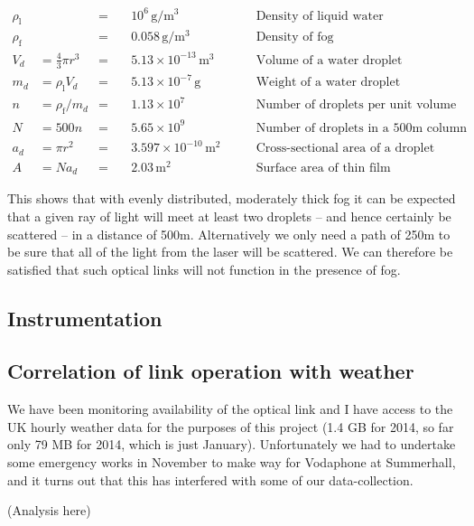 \begin{align}
  \rho_{\text{l}} &&=&\quad 10^6\,\text{g}/\text{m}^3 
  &\qquad\text{Density of liquid water}\\
  \rho_{\text{f}} &&=&\quad 0.058\,\text{g}/\text{m}^3
  &\qquad\text{Density of fog}\\
  V_d &= \frac{4}{3}\pi r^3 &=&\quad 5.13\times 10^{-13}\,\text{m}^3
  &\qquad\text{Volume of a water droplet}\\ 
  m_d &= \rho_{\text{l}} V_d &=&\quad 5.13\times 10^{-7}\,\text{g}
  &\qquad\text{Weight of a water droplet}\\
  n &= \rho_{\text{f}}/m_d &=&\quad 1.13\times 10^{7}
  &\qquad\text{Number of droplets per unit volume}\\
  N &= 500n &=&\quad 5.65\times 10^{9}
  &\qquad\text{Number of droplets in a 500m column}\\
  a_d &= \pi r^2 &=&\quad 3.597\times 10^{-10}\,\text{m}^2
  &\qquad \text{Cross-sectional area of a droplet}\\
  A &= Na_d &=&\quad 2.03\,\text{m}^2
  &\qquad \text{Surface area of thin film}
\end{align}

This shows that with evenly distributed, moderately thick fog it can
be expected that a given ray of light will meet at least two droplets
-- and hence certainly be scattered -- in a distance of
500m. Alternatively we only need a path of 250m to be sure that all of
the light from the laser will be scattered. We can therefore be
satisfied that such optical links will not function in the presence of
fog.

\clearpage
\subsection{Instrumentation}

\subsection{Correlation of link operation with weather}
\label{sec:weather}

We have been monitoring availability of the optical link and I have
access to the UK hourly weather data for the purposes of this project
(1.4 GB for 2014, so far only 79 MB for 2014, which is just
January). Unfortunately we had to undertake some emergency works in
November to make way for Vodaphone at Summerhall, and it turns out
that this has interfered with some of our data-collection.

(Analysis here)

